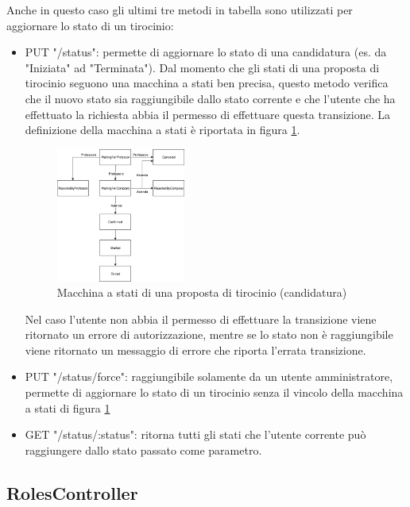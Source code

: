 Anche in questo caso gli ultimi tre metodi in tabella sono utilizzati per aggiornare lo stato di un tirocinio:
\begin{itemize}
	\item PUT "/status": permette di aggiornare lo stato di una candidatura (es. da "Iniziata" ad "Terminata"). Dal momento che gli stati di una proposta di tirocinio seguono una macchina a stati ben precisa, questo metodo verifica che il nuovo stato sia raggiungibile dallo stato corrente e che l'utente che ha effettuato la richiesta abbia il permesso di effettuare questa transizione. La definizione della macchina a stati è riportata in figura \ref{fig:internship-proposal-state-machine}.
	\begin{figure}[H] 
		\centering    
		\includegraphics[width=0.4\textwidth]{Chapter4/Figs/internship-proposal-state-machine}
		\caption[Macchina a stati di una proposta di tirocinio (candidatura)]{Macchina a stati di una proposta di tirocinio (candidatura)}
		\label{fig:internship-proposal-state-machine}
	\end{figure}
	Nel caso l'utente non abbia il permesso di effettuare la transizione viene ritornato un errore di autorizzazione, mentre se lo stato non è raggiungibile viene ritornato un messaggio di errore che riporta l'errata transizione.
	\item PUT "/status/force": raggiungibile solamente da un utente amministratore, permette di aggiornare lo stato di un tirocinio senza il vincolo della macchina a stati di 	figura \ref{fig:internship-proposal-state-machine}
	\item GET "/status/:status": ritorna tutti gli stati che l'utente corrente può raggiungere dallo stato passato come parametro.
\end{itemize}

\subsection{RolesController}

